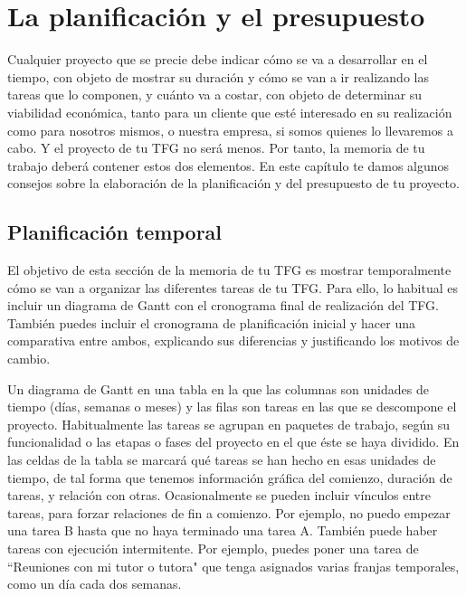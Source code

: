 \chapter{La planificación y el presupuesto}
\label{cap:PlanificacionPresupuesto}

Cualquier proyecto que se precie debe indicar cómo se va a desarrollar en el tiempo, con objeto de mostrar su duración y cómo se van a ir realizando las tareas que lo componen, y cuánto va a costar, con objeto de determinar su viabilidad económica, tanto para un cliente que esté interesado en su realización como para nosotros mismos, o nuestra empresa, si somos quienes lo llevaremos a cabo. Y el proyecto de tu TFG no será menos. Por tanto, la memoria de tu trabajo deberá contener estos dos elementos. En este capítulo te damos algunos consejos sobre la elaboración de la planificación y del presupuesto de tu proyecto.


\section{Planificación temporal}
El objetivo de esta sección de la memoria de tu TFG es mostrar temporalmente cómo se van a organizar las diferentes tareas de tu TFG. Para ello, lo habitual es incluir un diagrama de Gantt con el cronograma final de realización del TFG. También puedes incluir el cronograma de planificación inicial y hacer una comparativa entre ambos, explicando sus diferencias y justificando los motivos de cambio.

Un diagrama de Gantt en una tabla en la que las columnas son unidades de tiempo (días, semanas o meses) y las filas son tareas en las que se descompone el proyecto. Habitualmente las tareas se agrupan en paquetes de trabajo, según su funcionalidad o las etapas o fases del proyecto en el que éste se haya dividido. En las celdas de la tabla se marcará qué tareas se han hecho en esas unidades de tiempo, de tal forma que tenemos información gráfica del comienzo, duración de tareas, y relación con otras. Ocasionalmente se pueden incluir vínculos entre tareas, para forzar relaciones de fin a comienzo. Por ejemplo, no puedo empezar una tarea B hasta que no haya terminado una tarea A. También puede haber tareas con ejecución intermitente. Por ejemplo, puedes poner una tarea de ``Reuniones con mi tutor o tutora" que tenga asignados varias franjas temporales, como un día cada dos semanas.

